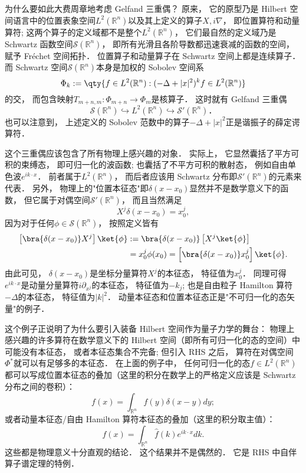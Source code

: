    为什么要如此大费周章地考虑 Gelfand 三重偶？ 原来， 它的原型乃是 Hilbert 空间语言中的位置表象空间$L^2(\mathbb{R}^n)$以及其上定义的算子$X,i\nabla$， 即位置算符和动量算符; 这两个算子的定义域都不是整个$L^2(\mathbb{R}^n)$， 它们最自然的定义域乃是 Schwartz 函数空间$\mathcal{S}(\mathbb{R}^n)$， 即所有光滑且各阶导数都迅速衰减的函数的空间， 赋予 Fréchet 空间拓扑． 位置算子和动量算子在 Schwartz 空间上都是连续算子． 而 Schwartz 空间$\mathcal{S}(\mathbb{R}^n)$本身是加权的 Sobolev 空间系
$$
\Phi_k := \qty{f \in L^2 (\mathbb{R}^n): (-\Delta + |x|^ 2)^{k} f \in L^2 (\mathbb{R}^n) }
$$
的交， 而包含映射$T_{m+n,m}:\Phi_{m+n}\to\Phi_m$是核算子． 这时就有 Gelfand 三重偶$$
\mathcal{S}(\mathbb{R}^n)\hookrightarrow L^2(\mathbb{R}^n)\hookrightarrow \mathcal{S}'(\mathbb{R}^n)．
$$也可以注意到， 上述定义的 Sobolev 范数中的算子$-\Delta+|x|^2$正是谐振子的薛定谔算符．

    这个三重偶应该包含了所有物理上感兴趣的对象． 实际上， 它显然囊括了平方可积的束缚态， 即可归一化的波函数; 也囊括了不平方可积的散射态， 例如自由单色波$e^{ik\cdot x}$． 前者属于$L^2(\mathbb{R}^n)$， 而后者应该用 Schwartz 分布即$\mathcal{S}'(\mathbb{R}^n)$的元素来代表． 另外， 物理上的"位置本征态"即$\delta(x-x_0)$显然并不是数学意义下的函数， 但它属于对偶空间$\mathcal{S}'(\mathbb{R}^n)$， 而且当然满足
$$
X^j\delta(x-x_0)=x_0^j,
$$
因为对于任何$\phi\in\mathcal{S}(\mathbb{R}^n)$， 按照定义皆有
$$
\begin{aligned}
\left[\bra{\delta(x-x_0)}X^j\right]\ket{\phi}
&:=\bra{\delta(x-x_0)}\left[X^j\ket{\phi}\right]\\
&=x_0^j\phi(x_0)
=\left[\bra{\delta(x-x_0)}x_0^j\right]\ket{\phi}.
\end{aligned}
$$
由此可见， $\delta(x-x_0)$是坐标分量算符$X^j$的本征态， 特征值为$x_0^j$． 同理可得$e^{ik\cdot x}$是动量分量算符$i\partial_{x^j}$的本征态， 特征值为$-k_j$; 也是自由粒子 Hamilton 算符$-\Delta$的本征态， 特征值为$|k|^2$． 动量本征态和位置本征态正是"不可归一化的态矢量"的例子． 

    这个例子正说明了为什么要引入装备 Hilbert 空间作为量子力学的舞台： 物理上感兴趣的许多算符在数学意义下的 Hilbert 空间（即所有可归一化的态的空间）中可能没有本征态， 或者本征态集合不完备; 但引入 RHS 之后， 算符在对偶空间$\Phi^*$就可以有足够多的本征态． 在上面的例子中， 任何可归一化的态$f\in{L^2}(\mathbb{R}^n)$都可以写成位置本征态的叠加（这里的积分在数学上的严格定义应该是 Schwartz 分布之间的卷积）：
$$
f(x)=\int_{\mathbb{R}^n}f(y)\delta(x-y)dy;
$$    
或者动量本征态/自由 Hamilton 算符本征态的叠加（这里的积分取主值）：
$$
f(x)=\int_{\mathbb{R}^n}\hat f(k)e^{ik\cdot x}dk.
$$
这些都是物理意义十分直观的结论． 这个结果并不是偶然的． 它是 RHS 中自伴算子谱定理的特例．
